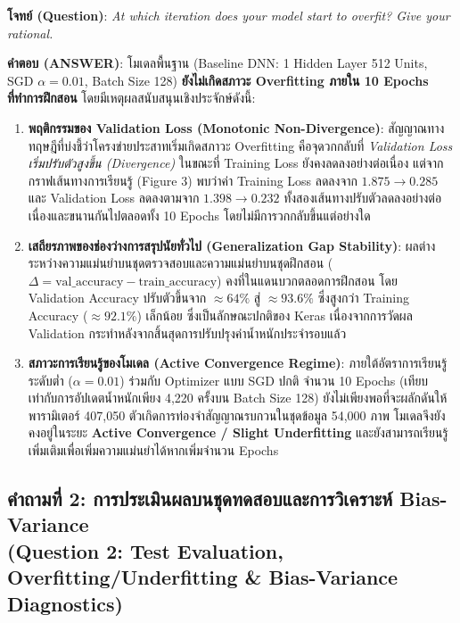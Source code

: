\documentclass[12pt,a4paper]{article}
\begin{document}
\begin{ansbox}
\textbf{โจทย์ (Question)}: \textit{At which iteration does your model start to overfit? Give your rational.}

\vspace{0.4em}
\textbf{คำตอบ (ANSWER)}:
โมเดลพื้นฐาน (Baseline DNN: 1 Hidden Layer 512 Units, SGD $\alpha=0.01$, Batch Size 128) \textbf{ยังไม่เกิดสภาวะ Overfitting ภายใน 10 Epochs ที่ทำการฝึกสอน} โดยมีเหตุผลสนับสนุนเชิงประจักษ์ดังนี้:

\begin{enumerate}[leftmargin=18pt, itemsep=4pt]
    \item \textbf{พฤติกรรมของ Validation Loss (Monotonic Non-Divergence)}:
    สัญญาณทางทฤษฎีที่บ่งชี้ว่าโครงข่ายประสาทเริ่มเกิดสภาวะ Overfitting คือจุดวกกลับที่ \textit{Validation Loss เริ่มปรับตัวสูงขึ้น (Divergence)} ในขณะที่ Training Loss ยังคงลดลงอย่างต่อเนื่อง แต่จากกราฟเส้นทางการเรียนรู้ (Figure 3) พบว่าค่า Training Loss ลดลงจาก $1.875 \rightarrow 0.285$ และ Validation Loss ลดลงตามจาก $1.398 \rightarrow 0.232$ ทั้งสองเส้นทางปรับตัวลดลงอย่างต่อเนื่องและขนานกันไปตลอดทั้ง 10 Epochs โดยไม่มีการวกกลับขึ้นแต่อย่างใด
    \item \textbf{เสถียรภาพของช่องว่างการสรุปนัยทั่วไป (Generalization Gap Stability)}:
    ผลต่างระหว่างความแม่นยำบนชุดตรวจสอบและความแม่นยำบนชุดฝึกสอน ($\Delta = \text{val\_accuracy} - \text{train\_accuracy}$) คงที่ในแดนบวกตลอดการฝึกสอน โดย Validation Accuracy ปรับตัวขึ้นจาก $\approx 64\%$ สู่ $\approx 93.6\%$ ซึ่งสูงกว่า Training Accuracy ($\approx 92.1\%$) เล็กน้อย ซึ่งเป็นลักษณะปกติของ Keras เนื่องจากการวัดผล Validation กระทำหลังจากสิ้นสุดการปรับปรุงค่าน้ำหนักประจำรอบแล้ว
    \item \textbf{สภาวะการเรียนรู้ของโมเดล (Active Convergence Regime)}:
    ภายใต้อัตราการเรียนรู้ระดับต่ำ ($\alpha=0.01$) ร่วมกับ Optimizer แบบ SGD ปกติ จำนวน 10 Epochs (เทียบเท่ากับการอัปเดตน้ำหนักเพียง 4,220 ครั้งบน Batch Size 128) ยังไม่เพียงพอที่จะผลักดันให้พารามิเตอร์ 407,050 ตัวเกิดการท่องจำสัญญาณรบกวนในชุดข้อมูล 54,000 ภาพ โมเดลจึงยังคงอยู่ในระยะ \textbf{Active Convergence / Slight Underfitting} และยังสามารถเรียนรู้เพิ่มเติมเพื่อเพิ่มความแม่นยำได้หากเพิ่มจำนวน Epochs
\end{enumerate}
\end{ansbox}

\clearpage
\subsection*{คำถามที่ 2: การประเมินผลบนชุดทดสอบและการวิเคราะห์ Bias-Variance\\ \normalsize(Question 2: Test Evaluation, Overfitting/Underfitting \& Bias-Variance Diagnostics)}
\end{document}
